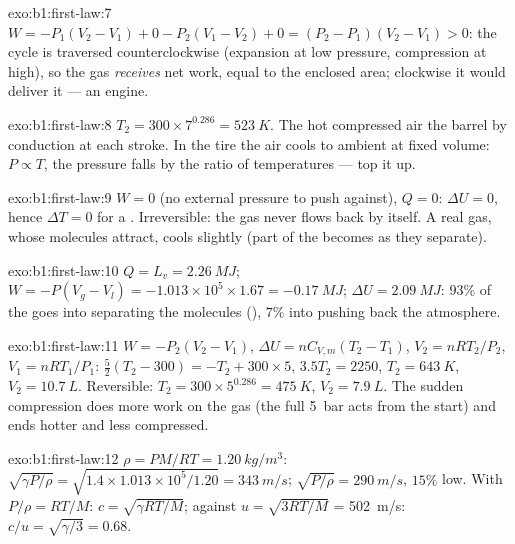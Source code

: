 \begin{solution}{exo:b1:first-law:7}
$W = -P_1(V_2 - V_1) + 0 - P_2(V_1 - V_2) + 0 = (P_2 - P_1)(V_2 - V_1) > 0$:
the cycle is traversed counterclockwise (expansion at low pressure,
compression at high), so the gas \emph{receives} net work, equal to the
enclosed area; clockwise it would deliver it --- an engine.
\end{solution}

\begin{solution}{exo:b1:first-law:8}
$T_2 = 300 \times 7^{0.286} = \qty{523}{K}$. The hot compressed air  the
barrel by conduction at each stroke. In the tire the air cools to
ambient at fixed volume: $P \propto T$, the pressure falls by the ratio
of temperatures --- top it up.
\end{solution}

\begin{solution}{exo:b1:first-law:9}
$W = 0$ (no external pressure to push against), $Q = 0$: $\Delta U = 0$,
hence $\Delta T = 0$ for a . Irreversible: the gas never flows
back by itself. A real gas, whose molecules attract, cools slightly
(part of the  becomes  as they separate).
\end{solution}

\begin{solution}{exo:b1:first-law:10}
$Q = L_v = \qty{2.26}{MJ}$; $W = -P(V_g - V_l) = -1.013\times10^5 \times 1.67 =
\qty{-0.17}{MJ}$; $\Delta U = \qty{2.09}{MJ}$: $93\%$ of the  goes into
separating the molecules (), $7\%$ into pushing back the
atmosphere.
\end{solution}

\begin{solution}{exo:b1:first-law:11}
$W = -P_2(V_2 - V_1)$, $\Delta U = nC_{V,m}(T_2 - T_1)$, $V_2 = nRT_2/P_2$, $V_1
= nRT_1/P_1$: $\tfrac52(T_2 - 300) = -T_2 + 300 \times 5$, $3.5T_2 = 2250$,
$T_2 = \qty{643}{K}$, $V_2 = \qty{10.7}{L}$. Reversible: $T_2 = 300 \times
5^{0.286} = \qty{475}{K}$, $V_2 = \qty{7.9}{L}$. The sudden compression does
more work on the gas (the full \qty{5}{bar} acts from the start) and ends
hotter and less compressed.
\end{solution}

\begin{solution}{exo:b1:first-law:12}
$\rho = PM/RT = \qty{1.20}{kg/m^3}$: $\sqrt{\gamma P/\rho} = \sqrt{1.4 \times
1.013\times10^5/1.20} = \qty{343}{m/s}$; $\sqrt{P/\rho} = \qty{290}{m/s}$, $15\%$
low. With $P/\rho = RT/M$: $c = \sqrt{\gamma RT/M}$; against $u = \sqrt{3RT/M}$
= \qty{502}{m/s}: $c/u = \sqrt{\gamma/3} = 0.68$.
\end{solution}

